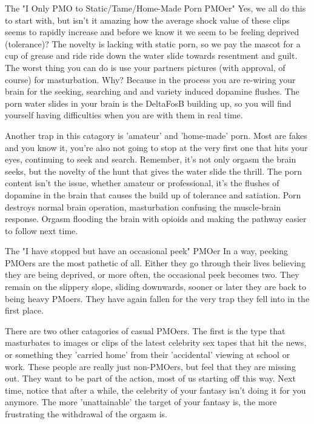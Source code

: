 The "I Only PMO to Static/Tame/Home-Made Porn PMOer"
  Yes, we all do this to start with, but isn't it amazing how the average shock value of these clips seems to rapidly increase and before we know it we seem to be feeling deprived (tolerance)? The novelty is lacking with static porn, so we pay the mascot for a cup of grease and ride ride down the water slide towards resentment and guilt. The worst thing you can do is use your partners pictures (with approval, of course) for masturbation. Why? Because in the process you are re-wiring your brain for the seeking, searching and and variety induced dopamine flushes. The porn water slides in your brain is the DeltaFosB building up, so you will find yourself having difficulties when you are with them in real time.

  Another trap in this catagory is 'amateur' and 'home-made' porn. Most are fakes and you know it, you're also not going to stop at the very first one that hits your eyes, continuing to seek and search. Remember, it's not only orgasm the brain seeks, but the novelty of the hunt that gives the water slide the thrill. The porn content isn't the issue, whether amateur or professional, it's the flushes of dopamine in the brain that causes the build up of tolerance and satiation. Porn destroys normal brain operation, masturbation confusing the muscle-brain response. Orgasm flooding the brain with opioids and making the pathway easier to follow next time.

The "I have stopped but have an occasional peek" PMOer
In a way, peeking PMOers are the most pathetic of all. Either they go through their lives believing they are being deprived, or more often, the occasional peek becomes two. They remain on the slippery slope, sliding downwards, sooner or later they are back to being heavy PMoers. They have again fallen for the very trap they fell into in the first place.


There are two other catagories of casual PMOers. The first is the type that masturbates to images or clips of the latest celebrity sex tapes that hit the news, or something they 'carried home' from their 'accidental' viewing at school or work. These people are really just non-PMOers, but feel that they are missing out. They want to be part of the action, most of us starting off this way. Next time, notice that after a while, the celebrity of your fantasy isn't doing it for you anymore. The more 'unattainable' the target of your fantasy is, the more frustrating the withdrawal of the orgasm is.

